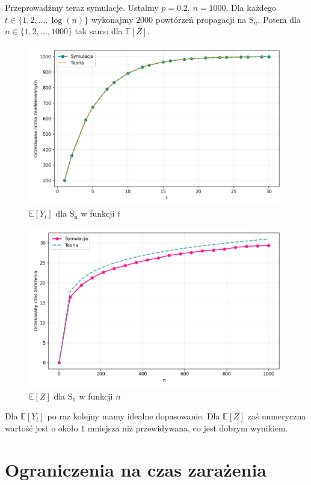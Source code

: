 Przeprowadźmy teraz symulacje. Ustalmy $p=0.2$, $n=1000$. Dla każdego $t\in\{1, 2, \dots, \log(n)\}$ wykonajmy $2000$ powtórzeń propagacji na $\mathrm{S}_n$. Potem dla $n\in\{1,2,\dots,1000\}$ tak samo dla $\mathbb{E}[Z]$. 
\begin{figure}[!ht]
    \centering
    \includegraphics[width=1\textwidth]{../img/star/final_infection_expectations.png}
    \caption{$\mathbb{E}[Y_t]$ dla $\mathrm{S_n}$ w funkcji $t$}
\end{figure}
\begin{figure}[!ht]
    \centering
    \includegraphics[width=1\textwidth]{../img/star/full_infection_expectation.png}
    \caption{$\mathbb{E}[Z]$ dla $\mathrm{S_n}$ w funkcji $n$}
\end{figure}
Dla $\mathbb{E}[Y_t]$ po raz kolejny mamy idealne dopasowanie. Dla $\mathbb{E}[Z]$ zaś numeryczna wartość jest o około $1$ mniejsza niż przewidywana, co jest dobrym wynikiem.


\section{Ograniczenia na czas zarażenia}

